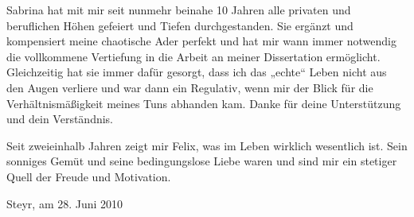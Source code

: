 Sabrina hat mit mir seit nunmehr beinahe 10 Jahren alle privaten und beruflichen Höhen gefeiert und Tiefen durchgestanden. Sie ergänzt und kompensiert meine chaotische Ader perfekt und hat mir wann immer notwendig die vollkommene Vertiefung in die Arbeit an meiner Dissertation ermöglicht. Gleichzeitig hat sie immer dafür gesorgt, dass ich das „echte“ Leben nicht aus den Augen verliere und war dann ein Regulativ, wenn mir der Blick für die Verhältnismäßigkeit meines Tuns abhanden kam. Danke für deine Unterstützung und dein Verständnis.

Seit zweieinhalb Jahren zeigt mir Felix, was im Leben wirklich wesentlich ist. Sein sonniges Gemüt und seine bedingungslose Liebe waren und sind mir ein stetiger Quell der Freude und Motivation. 

\begin{flushright}
 Steyr, am 28. Juni 2010
\end{flushright}

